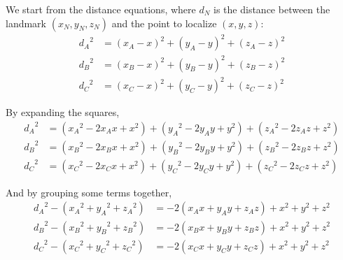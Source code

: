 \documentclass[preview,border=12pt]{standalone}
\begin{document}
We start from the distance equations, where \(d_N\) is the distance between the landmark \(\left(x_N, y_N, z_N\right)\) and the point to localize \(\left(x, y, z\right)\):
\begin{align*}
    {d_A}^2 & = \left(x_A - x\right)^2 + \left(y_A - y\right)^2 + \left(z_A - z\right)^2 \\
    {d_B}^2 & = \left(x_B - x\right)^2 + \left(y_B - y\right)^2 + \left(z_B - z\right)^2 \\
    {d_C}^2 & = \left(x_C - x\right)^2 + \left(y_C - y\right)^2 + \left(z_C - z\right)^2
\end{align*}

By expanding the squares,
\begin{align*}
    {d_A}^2 & = \left({x_A}^2 - 2 x_A x + x^2\right) + \left({y_A}^2 - 2 y_A y + y^2\right) + \left({z_A}^2 - 2 z_A z + z^2\right) \\
    {d_B}^2 & = \left({x_B}^2 - 2 x_B x + x^2\right) + \left({y_B}^2 - 2 y_B y + y^2\right) + \left({z_B}^2 - 2 z_B z + z^2\right) \\
    {d_C}^2 & = \left({x_C}^2 - 2 x_C x + x^2\right) + \left({y_C}^2 - 2 y_C y + y^2\right) + \left({z_C}^2 - 2 z_C z + z^2\right)
\end{align*}

And by grouping some terms together,
\begin{align*}
    {d_A}^2 - \left({x_A}^2 + {y_A}^2 + {z_A}^2 \right) & = -2 \left(x_A x + y_A y + z_A z\right) + x^2 + y^2 + z^2 \\
    {d_B}^2 - \left({x_B}^2 + {y_B}^2 + {z_B}^2 \right) & = -2 \left(x_B x + y_B y + z_B z\right) + x^2 + y^2 + z^2 \\
    {d_C}^2 - \left({x_C}^2 + {y_C}^2 + {z_C}^2 \right) & = -2 \left(x_C x + y_C y + z_C z\right) + x^2 + y^2 + z^2
\end{align*}
\end{document}
